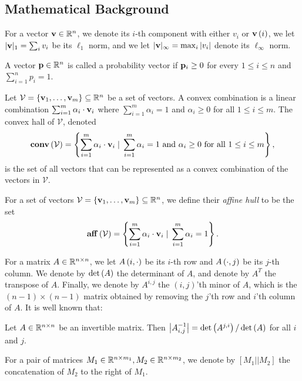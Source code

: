 \documentclass{llncs}
\newcommand{\V}{\mathcal{V}}
\newcommand{\affine}[1]{\normalfont{\mathbf{aff}}\of{#1}}
\newcommand{\aff}[1]{\affine{#1}}
\newcommand{\CH}[1]{\normalfont{\mathbf{conv}\of{#1}}}
\newcommand{\p}{\myvec{p}}
\renewcommand{\v}{\myvec{v}}
\renewcommand{\det}[1]{\operatorname{det}\of{#1}}
\begin{document}
\subsection{Mathematical Background}
For a vector $\v\in\R^n$, we denote its $i$-th component with either $v_i$ or $\v\of{i}$, we let $|\v|_1=\sum_{i}v_i$ be its $\ell_1$ norm, and we let $|\v|_\infty=\max_i |v_i|$ denote its $\ell_\infty$ norm.

A vector $\p\in\R^n$ is called a probability vector if $\p_i\geq 0$ for every $1 \leq i\leq n$ and $\sum_{i=1}^n p_i=1$. 

\begin{definition}
Let $\V=\{\v_1,\ldots,\v_m\}\subseteq\R^n$ be a set of vectors. A convex combination is a linear combination $\sum_{i=1}^m \alpha_i\cdot\v_i$ where $\sum_{i=1}^m\alpha_i=1$ and $\alpha_i\geq 0$ for all $1\leq i\leq m$. The convex hall of $\V$, denoted
$$\CH{\V}=\set{\sum_{i=1}^m\alpha_i\cdot\v_i\cond \sum_{i=1}^m\alpha_i=1\text{ and } \alpha_i\geq 0 \text{ for all } 1\leq i\leq m},$$ 
is the set of all vectors that can be represented as a convex combination of the vectors in $\V$.
\end{definition}

\begin{definition}
	For a set of vectors $\V=\{\v_1,\ldots,\v_m\}\subseteq\R^n$, we define their \emph{affine hull} to be the set
    $$\aff{\V}=\set{\sum_{i=1}^m\alpha_i\cdot\v_i\cond \sum_{i=1}^m\alpha_i=1}.$$
\end{definition}

For a matrix $A\in {\mathbb R}^{n\times n}$, we let $A\left ( i,\cdot \right )$ be its $i$-th row and $A\left ( \cdot,j \right )$ be its $j$-th column. We denote by $\det{A}$ the determinant of $A$, and denote by $A^T$ the transpose of $A$. Finally, we denote by $A^{i,j}$ the $(i,j)$'th minor of $A$, which is the $(n-1)\times(n-1)$ matrix obtained by removing the $j$'th row and $i$'th column of $A$.
It is well known that:
\begin{fact}\label{fact-cramer}
Let $A\in{\mathbb R}^{n\times n}$ be an invertible matrix. Then $\abs{A^{-1}_{i,j}}=\det{A^{j,i}}/\det{A}$ for all $i$ and $j$.
\end{fact}
For a pair of matrices $M_1\in {\mathbb R}^{n\times m_1},M_2\in {\mathbb R}^{n\times m_2}$, we denote by $\left[M_1||M_2\right]$ the concatenation of $M_2$ to the right of $M_1$.
\end{document}
